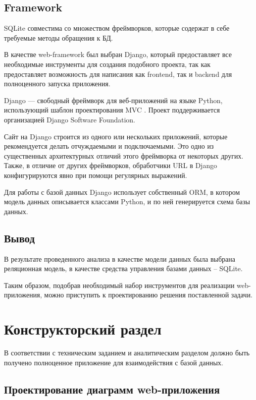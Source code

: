 \documentclass[a4paper, 14pt]{article}
\begin{document}
	\subsection{Framework}
	
	SQLite совместима со множеством фреймворков, которые содержат в себе требуемые методы обращения к БД.
	
	В качестве web-framework был выбран Django, который предоставляет все необходимые инструменты для создания подобного проекта, так как предоставляет возможность для написания как frontend, так и backend для полноценного запуска приложения.
	
	Django — свободный фреймворк для веб-приложений на языке Python, использующий шаблон проектирования MVC \cite{mvc}. Проект поддерживается организацией Django Software Foundation.
	
	Сайт на Django строится из одного или нескольких приложений, которые рекомендуется делать отчуждаемыми и подключаемыми. Это одно из существенных архитектурных отличий этого фреймворка от некоторых других. Также, в отличие от других фреймворков, обработчики URL в Django конфигурируются явно при помощи регулярных выражений.
	
	Для работы с базой данных Django использует собственный ORM, в котором модель данных описывается классами Python, и по ней генерируется схема базы данных. \cite{2}
	
	\subsection{Вывод}
	
	В результате проведенного анализа в качестве модели данных была выбрана реляционная модель, в качестве средства управления базами данных – SQLite.
	
	Таким образом, подобрав необходимый набор инструментов для реализации web-приложения, можно приступить к проектированию решения поставленной задачи.
	\newpage
	\section {Конструкторский раздел}
	
	В соответствии с техническим заданием и аналитическим разделом должно быть получено полноценное приложение для взаимодействия с базой данных.
	
	\subsection{Проектирование диаграмм web-приложения}
	
\end{document}
